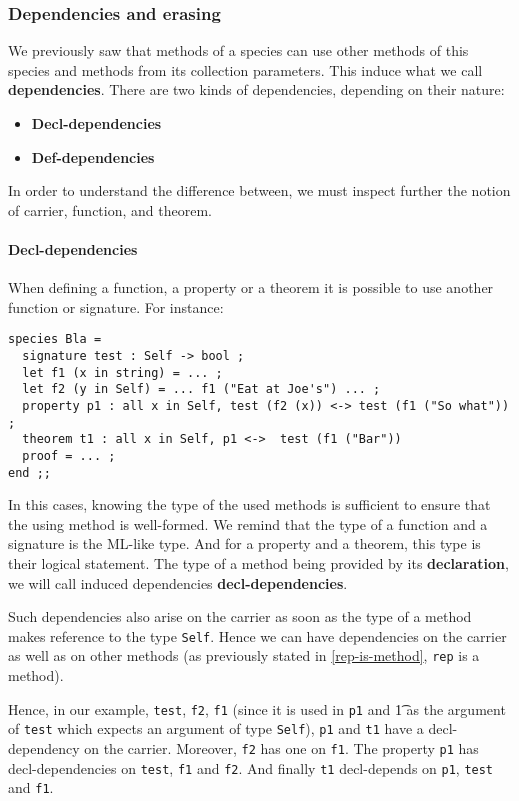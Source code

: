 \subsubsection{Dependencies and erasing}
We previously saw that methods of a species can use other methods of
this species and methods from its collection parameters. This induce
what we call {\bf dependencies}. There are two kinds
of dependencies, depending on their nature:
\begin{itemize}
  \item {\bf Decl-dependencies}
  \item {\bf Def-dependencies}
\end{itemize}
In order to understand the difference between, we must inspect further
the notion of carrier, function, and theorem.



\paragraph{Decl-dependencies}
When defining a function, a property or a theorem it is possible to
use another function or signature. For instance:
{\scriptsize
\begin{lstlisting}
species Bla =
  signature test : Self -> bool ;
  let f1 (x in string) = ... ;
  let f2 (y in Self) = ... f1 ("Eat at Joe's") ... ;
  property p1 : all x in Self, test (f2 (x)) <-> test (f1 ("So what")) ;
  theorem t1 : all x in Self, p1 <->  test (f1 ("Bar"))
  proof = ... ;
end ;;
\end{lstlisting}
}

In this cases, knowing the type of the used methods is sufficient to
ensure that the using method is well-formed. We remind that the type
of a function and a signature is the ML-like type. And for a property
and a theorem, this type is their logical statement. The type of a
method being provided by its {\bf declaration}, we will call induced
dependencies {\bf decl-dependencies}.

Such dependencies also arise on the carrier as soon as the type of a
method makes reference to the type {\tt Self}. Hence we can have
dependencies on the carrier as well as on other methods (as
previously stated in \ref{rep-is-method}, {\tt rep} is a method).

Hence, in our example, {\tt test}, {\tt f2}, {\tt f1} (since it is
used in {\tt p1} and {\t1} as the argument of {\tt test} which expects
an argument of type {\tt Self}), {\tt p1} and {\tt t1} have a
decl-dependency on the carrier. Moreover, {\tt f2} has one on
{\tt f1}. The property {\tt p1} has decl-dependencies on {\tt test},
{\tt f1} and {\tt f2}. And finally {\tt t1} decl-depends on {\tt p1},
{\tt test} and {\tt f1}.



